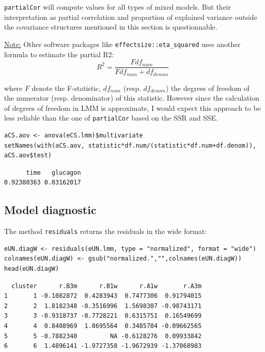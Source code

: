 \documentclass[12pt]{article}
\newcommand\Warning[1][3ex]{%
\renewcommand\stacktype{L}%
\scaleto{\stackon[1.3pt]{\color{red}$\triangle$}{\tiny\bfseries !}}{#1}%
\xspace
}
\begin{document}
\bigskip

\Warning \texttt{partialCor} will compute values for all types of mixed
models. But their interpretation as partial correlation and proportion
of explained variance outside the covariance structures mentioned in
this section is questionnable.

\bigskip

\uline{Note:} Other software packages like \texttt{effectsize::eta\_squared} uses
another formula to estimate the partial R2:
\[ R^2=\frac{F df_{num}}{F df_{num} + df_{denom}} \]

where \(F\) denote the F-statistic, \(df_{num}\)
(resp. \(df_{denom}\)) the degrees of freedom of the numerator
(resp. denominator) of this statistic. However since the calculation
of degrees of freedom in LMM is approximate, I would expect this
approach to be less reliable than the one of \texttt{partialCor} based on the
SSR and SSE.

\lstset{language=r,label= ,caption= ,captionpos=b,numbers=none}
\begin{lstlisting}
aCS.aov <- anova(eCS.lmm)$multivariate
setNames(with(aCS.aov, statistic*df.num/(statistic*df.num+df.denom)), aCS.aov$test)
\end{lstlisting}

\begin{verbatim}
      time   glucagon 
0.92380363 0.03162017
\end{verbatim}



\bigskip


\clearpage

\subsection{Model diagnostic}
\label{sec:orgf624bf1}

The method \texttt{residuals} returns the residuals in the wide format:
\lstset{language=r,label= ,caption= ,captionpos=b,numbers=none}
\begin{lstlisting}
eUN.diagW <- residuals(eUN.lmm, type = "normalized", format = "wide")
colnames(eUN.diagW) <- gsub("normalized.","",colnames(eUN.diagW))
head(eUN.diagW)
\end{lstlisting}

\begin{verbatim}
  cluster      r.B3m      r.B1w      r.A1w       r.A3m
1       1 -0.1082872  0.4283943  0.7477306  0.91794015
2       2  1.8182348 -0.3516996  1.5698307 -0.98743171
3       3 -0.9318737 -0.7728221  0.6315751  0.16549699
4       4  0.8408969  1.8695564  0.3485784 -0.09662565
5       5 -0.7882340         NA -0.6128276  0.09933842
6       6  1.4896141 -1.9727358 -1.9672939 -1.37068983
\end{verbatim}
\end{document}
